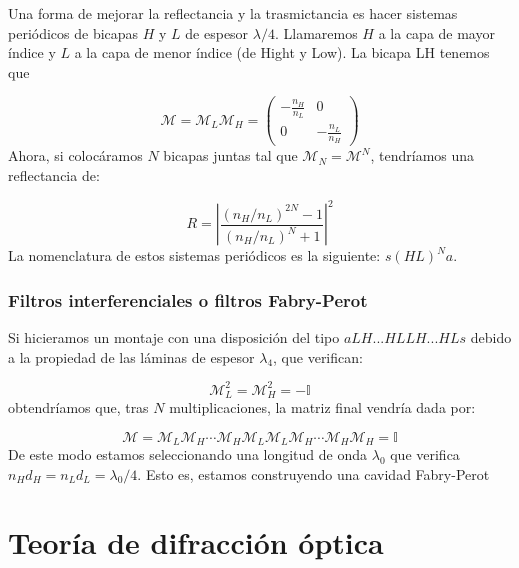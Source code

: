 \documentclass[12pt,a4paper]{book}
\numberwithin{equation}{section}
\numberwithin{figure}{section}
\newcommand{\1}{_{(1)}}
\newcommand{\2}{_{(2)}}
\theoremstyle{definition}
\begin{document}
Una forma de mejorar la reflectancia y la trasmictancia es hacer sistemas periódicos de bicapas $H$ y $L$ de espesor $\lambda/4$. Llamaremos $H$ a la capa de mayor índice y $L$ a la capa de menor índice (de Hight y Low). La bicapa LH tenemos que

\begin{equation}
\mathcal{M} = \mathcal{M}_L \mathcal{M}_H = 
\begin{pmatrix}
-\frac{n_H}{n_L} & 0\\
0 & -\frac{n_L}{n_H}
\end{pmatrix}
\end{equation}
Ahora, si colocáramos $N$ bicapas juntas tal que $\mathcal{M}_N=\mathcal{M}^N$, tendríamos una reflectancia de:

\begin{equation}
R = \left| \frac{(n_H/n_L)^{2N}-1}{(n_H/n_L)^N+1} \right|^2
\end{equation}
La nomenclatura de estos sistemas periódicos es la siguiente: $s(HL)^Na$.
 
\subsection{Filtros interferenciales o filtros Fabry-Perot}

Si hicieramos un montaje con una disposición del tipo $aLH...HLLH...HLs$ debido a la propiedad de las láminas de espesor $\lambda_4$, que verifican:

\begin{equation}
\mathcal{M}_L^2 = \mathcal{M}_H^2 =  -\mathbb{I}
\end{equation}
obtendríamos que, tras $N$ multiplicaciones, la  matriz final vendría dada por:

\begin{equation}
\mathcal{M} = \mathcal{M}_L \mathcal{M}_H \cdots \mathcal{M}_H \mathcal{M}_L
\mathcal{M}_L \mathcal{M}_H \cdots \mathcal{M}_H \mathcal{M}_H = \mathbb{I}
\end{equation}
De este modo estamos seleccionando una longitud de onda $\lambda_0$ que verifica $n_Hd_H = n_L d_L = \lambda_0 /4$. Esto es, estamos construyendo una cavidad Fabry-Perot

\newpage

\chapter{Teoría de difracción óptica} \label{Sec:5}
\end{document}
